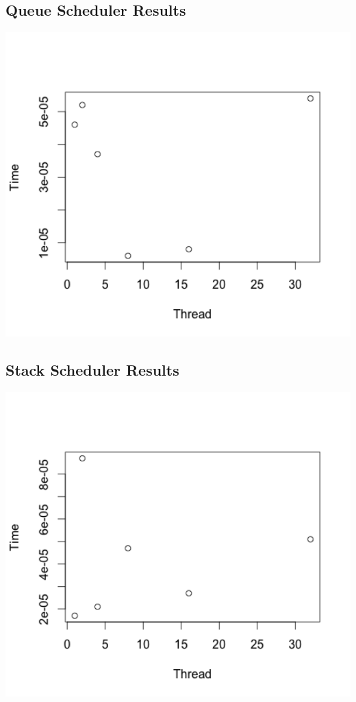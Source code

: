 \documentclass[10pt]{article}
\begin{document}
\subsection{Queue Scheduler Results}
\includegraphics[width=1.0\textwidth]{queue.png}

\subsection{Stack Scheduler Results}
\includegraphics[width=1.0\textwidth]{stack.png}
\end{document}
